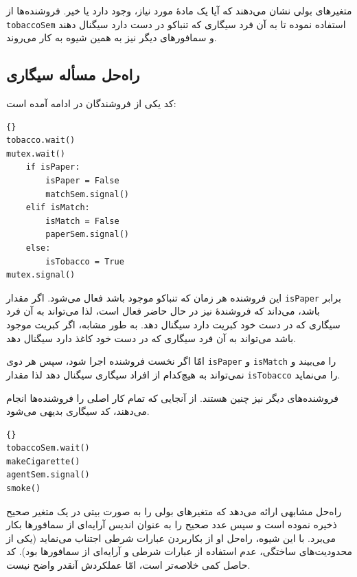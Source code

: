 \documentclass{book}
\newcommand{\clearemptydoublepage}{}%
\begin{document}
    متغیرهای بولی نشان می‌دهند که آیا یک مادهٔ مورد نیاز، وجود دارد یا خیر. 
    فروشنده‌‌ها از {\tt tobaccoSem} استفاده نموده تا به آن فرد سیگاری که تنباکو در دست دارد سیگنال دهند و سمافورهای دیگر نیز به همین شیوه به کار می‌روند.


\clearemptydoublepage
\subsection{راه‌حل مسأله سیگاری}

    کد یکی از فروشندگان در ادامه آمده است:‌

\begin{latin}
\begin{lstlisting}[title=\rl{فروشنده \lr{A}}]{}
tobacco.wait()
mutex.wait()
    if isPaper:
        isPaper = False
        matchSem.signal()
    elif isMatch:
        isMatch = False
        paperSem.signal()
    else: 
        isTobacco = True
mutex.signal()
\end{lstlisting}
\end{latin}

    این فروشنده هر زمان که تنباکو موجود باشد فعال می‌شود. اگر مقدار {\tt isPaper} برابر  باشد، می‌داند که فروشندهٔ‌  نیز در حال 
    حاضر فعال است، لذا می‌تواند به آن فرد سیگاری که در دست خود کبریت دارد سیگنال دهد. به طور مشابه، اگر کبریت موجود باشد می‌تواند به آن فرد 
    سیگاری که در دست خود کاغذ دارد سیگنال دهد. 

    امّا اگر نخست فروشنده  اجرا شود، سپس هر دوی {\tt isPaper} و  {\tt isMatch}  را  می‌بیند و نمی‌تواند به هیچ‌کدام از افراد 
    سیگاری سیگنال دهد لذا مقدار  {\tt isTobacco} را   می‌نماید. 

    فروشنده‌های دیگر نیز چنین هستند. از آنجایی که  تمام کار اصلی را فروشنده‌ها انجام می‌دهند، کد سیگاری بدیهی می‌شود.

\begin{latin}
\begin{lstlisting}[title=\rl{سیگاری تنباکو‌دار}]{}
tobaccoSem.wait()
makeCigarette()
agentSem.signal()
smoke()
\end{lstlisting}
\end{latin}

    راه‌حل مشابهی ارائه می‌دهد که متغیرهای بولی را به صورت بیتی در یک متغیر صحیح ذخیره نموده است و سپس عدد صحیح را به عنوان 
    اندیس آرایه‌ای از سمافورها بکار می‌برد. با این شیوه، راه‌حل او از بکاربردن عبارات شرطی اجتناب می‌نماید (یکی از محدودیت‌های ساختگی، عدم استفاده 
    از عبارات شرطی و آرایه‌ای از سمافورها بود). 
    کد حاصل کمی خلاصه‌تر است، امّا عملکردش آنقدر واضح نیست. 
    
\end{document}

